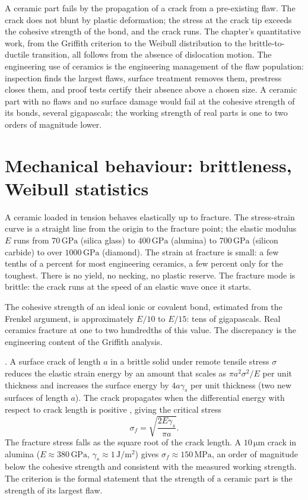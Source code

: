 \begin{archetype}[Failure]
A ceramic part fails by the propagation of a crack from a pre-existing
flaw. The crack does not blunt by plastic deformation; the stress at
the crack tip exceeds the cohesive strength of the bond, and the crack
runs. The chapter's quantitative work, from the Griffith criterion to
the Weibull distribution to the brittle-to-ductile transition, all
follows from the absence of dislocation motion. The engineering use of
ceramics is the engineering management of the flaw population:
inspection finds the largest flaws, surface treatment removes them,
prestress closes them, and proof tests certify their absence above a
chosen size. A ceramic part with no flaws and no surface damage would
fail at the cohesive strength of its bonds, several gigapascals; the
working strength of real parts is one to two orders of magnitude lower.
\end{archetype}

\section{Mechanical behaviour: brittleness, Weibull statistics}

A ceramic loaded in tension behaves elastically up to fracture. The
stress-strain curve is a straight line from the origin to the
fracture point; the elastic modulus $E$ runs from $70\,\text{GPa}$
(silica glass) to $400\,\text{GPa}$ (alumina) to $700\,\text{GPa}$
(silicon carbide) to over $1000\,\text{GPa}$ (diamond). The strain at
fracture is small: a few tenths of a percent for most engineering
ceramics, a few percent only for the toughest. There is no yield, no
necking, no plastic reserve. The fracture mode is brittle: the crack
runs at the speed of an elastic wave once it starts.

The cohesive strength of an ideal ionic or covalent bond, estimated
from the Frenkel argument, is approximately $E/10$ to $E/15$: tens of
gigapascals. Real ceramics fracture at one to two hundredths of this
value. The discrepancy is the engineering content of the Griffith
analysis.

. A surface crack of length $a$ in a
brittle solid under remote tensile stress $\sigma$ reduces the elastic
strain energy by an amount that scales as $\pi a^2 \sigma^2/E$ per
unit thickness and increases the surface energy by $4 a \gamma_s$ per
unit thickness (two new surfaces of length $a$). The crack propagates
when the differential energy with respect to crack length is positive
\cite[ch.~15]{text:callister2018}, giving the critical stress
\[
\sigma_f = \sqrt{\frac{2 E \gamma_s}{\pi a}}.
\]
The fracture stress falls as the square root of the crack length. A
$10\,\si{\micro\meter}$ crack in alumina ($E \approx 380\,\text{GPa}$,
$\gamma_s \approx 1\,\text{J}/\text{m}^2$) gives
$\sigma_f \approx 150\,\text{MPa}$, an order of magnitude below the
cohesive strength and consistent with the measured working strength.
The criterion is the formal statement that the strength of a ceramic
part is the strength of its largest flaw.


